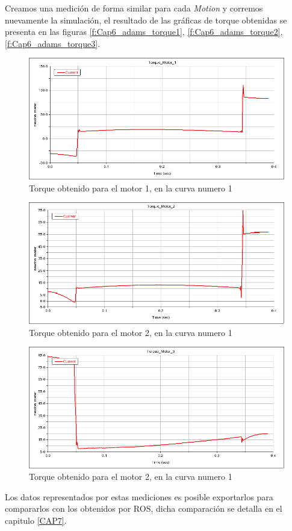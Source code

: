     Creamos una medición de forma similar para cada \textit{Motion} y corremos nuevamente la simulación, el resultado de las gráficas de torque obtenidas se presenta en las figuras \eqref{f:Cap6_adams_torque1}, \eqref{f:Cap6_adams_torque2}, \eqref{f:Cap6_adams_torque3}.
    
    \begin{figure}[H]
        \centering
        \includegraphics[width=1\linewidth]{Main/Chapter6/Images6/adams/motions/torque1.png}
        \caption{Torque obtenido para el motor 1, en la curva numero 1}
        \label{f:Cap6_adams_torque1}
    \end{figure}
    
    \begin{figure}[H]
        \centering
        \includegraphics[width=1\linewidth]{Main/Chapter6/Images6/adams/motions/torque2.png}
        \caption{Torque obtenido para el motor 2, en la curva numero 1}
        \label{f:Cap6_adams_torque2}
    \end{figure}
    
    \begin{figure}[H]
        \centering
        \includegraphics[width=1\linewidth]{Main/Chapter6/Images6/adams/motions/torque3.png}
        \caption{Torque obtenido para el motor 2, en la curva numero 1}
        \label{f:Cap6_adams_torque3}
    \end{figure}
    
    Los datos representados por estas mediciones es posible exportarlos para compararlos con los obtenidos por ROS, dicha comparación se detalla en el capitulo \ref{CAP7}.